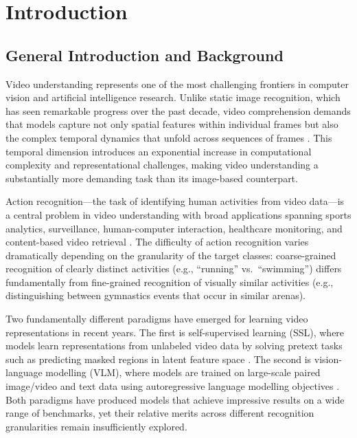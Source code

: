 \chapter{Introduction}

\section{General Introduction and Background}

Video understanding represents one of the most challenging frontiers in computer vision and artificial intelligence research. Unlike static image recognition, which has seen remarkable progress over the past decade, video comprehension demands that models capture not only spatial features within individual frames but also the complex temporal dynamics that unfold across sequences of frames \citep{bardes2024vjepa}. This temporal dimension introduces an exponential increase in computational complexity and representational challenges, making video understanding a substantially more demanding task than its image-based counterpart.

Action recognition---the task of identifying human activities from video data---is a central problem in video understanding with broad applications spanning sports analytics, surveillance, human-computer interaction, healthcare monitoring, and content-based video retrieval \citep{bordes2024vlm}. The difficulty of action recognition varies dramatically depending on the granularity of the target classes: coarse-grained recognition of clearly distinct activities (e.g., ``running'' vs.\ ``swimming'') differs fundamentally from fine-grained recognition of visually similar activities (e.g., distinguishing between gymnastics events that occur in similar arenas).

Two fundamentally different paradigms have emerged for learning video representations in recent years. The first is self-supervised learning (SSL), where models learn representations from unlabeled video data by solving pretext tasks such as predicting masked regions in latent feature space \citep{assran2023ijepa, assran2025vjepa2, murlabadia2026vjepa21}. The second is vision-language modelling (VLM), where models are trained on large-scale paired image/video and text data using autoregressive language modelling objectives \citep{bordes2024vlm, bai2025qwen2vl}. Both paradigms have produced models that achieve impressive results on a wide range of benchmarks, yet their relative merits across different recognition granularities remain insufficiently explored.

